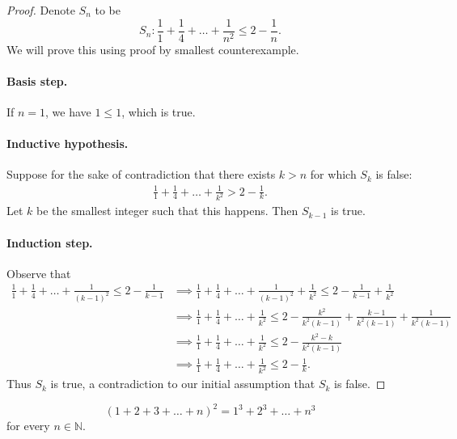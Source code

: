\documentclass{exam}
\begin{document}
\begin{proof}
    Denote $S_n$ to be $$S_n:\frac11+\frac14+\dots+\frac1{n^2}\le2-\frac1n.$$ We will prove this using proof by smallest counterexample.

    \paragraph{Basis step.} If $n=1$, we have $1\le1$, which is true.

    \paragraph{Inductive hypothesis.} Suppose for the sake of contradiction that there exists $k>n$ for which $S_k$ is false:
    \begin{align*}
        \frac11+\frac14+\dots+\frac1{k^2}>2-\frac1k.
    \end{align*}
    Let $k$ be the smallest integer such that this happens. Then $S_{k-1}$ is true.

    \paragraph{Induction step.} Observe that
    \begin{align*}
        \frac11+\frac14+\dots+\frac1{(k-1)^2}\le2-\frac1{k-1}&\implies\frac11+\frac14+\dots+\frac1{(k-1)^2}+\frac1{k^2}\le2-\frac1{k-1}+\frac1{k^2}\\
        &\implies\frac11+\frac14+\dots+\frac1{k^2}\le2-\frac{k^2}{k^2(k-1)}+\frac{k-1}{k^2(k-1)}+\frac1{k^2(k-1)}\\
        &\implies\frac11+\frac14+\dots+\frac1{k^2}\le2-\frac{k^2-k}{k^2(k-1)}\\
        &\implies\frac11+\frac14+\dots+\frac1{k^2}\le2-\frac1k.
    \end{align*}
    Thus $S_k$ is true, a contradiction to our initial assumption that $S_k$ is false.
\end{proof}

\begin{proposition}{10.20}
    $$(1+2+3+\dots+n)^2=1^3+2^3+\dots+n^3$$ for every $n\in\mathbb N$.
\end{proposition}
\end{document}
